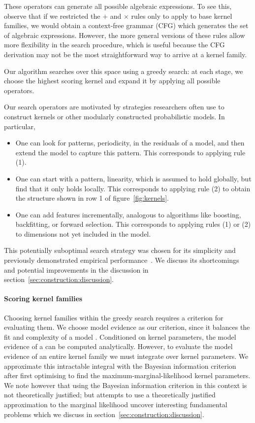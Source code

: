 These operators can generate all possible algebraic expressions.
To see this, observe that if we restricted the $+$ and $\times$ rules only to apply to base kernel families, we would obtain a context-free grammar (CFG) which generates the set of algebraic expressions.
However, the more general versions of these rules allow more flexibility in the search procedure, which is useful because the CFG derivation may not be the most straightforward way to arrive at a kernel family.

Our algorithm searches over this space using a greedy search: at each stage, we choose the highest scoring kernel and expand it by applying all possible operators.

Our search operators are motivated by strategies researchers often use to construct kernels or other modularly constructed probabilistic models.
In particular,
\begin{itemize}
\item One can look for patterns, \eg periodicity, in the residuals of a model, and then extend the model to capture this pattern.
This corresponds to applying rule (1).
\item One can start with a pattern, \eg linearity, which is assumed to hold globally, but find that it only holds locally.
This corresponds to applying rule (2) to obtain the structure shown in row 1 of figure~\ref{fig:kernels}.
\item One can add features incrementally, analogous to algorithms like boosting, backfitting, or forward selection.
This corresponds to applying rules (1) or (2) to dimensions not yet included in the model.
\end{itemize}

This potentially suboptimal search strategy was chosen for its simplicity and previously demonstrated empirical performance~\citep{Grosse2012-zi}.
We discuss its shortcomings and potential improvements in the discussion in section~\ref{sec:construction:discussion}.

\paragraph{Scoring kernel families}

Choosing kernel families within the greedy search requires a criterion for evaluating them.
We choose model evidence as our criterion, since it balances the fit and complexity of a model \citep[e.g.][]{Rasmussen2001-rv}.  Conditioned on kernel parameters, the model evidence of a \gp{} can be computed analytically.
However, to evaluate the model evidence of an entire kernel family we must integrate over kernel parameters. 
We approximate this intractable integral with the Bayesian information criterion \citep{Schwarz1978-wp} after first optimising to find the maximum-marginal-likelihood kernel parameters.
We note however that using the Bayesian information criterion in this context is not theoretically justified; but attempts to use a theoretically justified approximation to the marginal likelihood uncover interesting fundamental problems which we discuss in section~\ref{sec:construction:discussion}.


